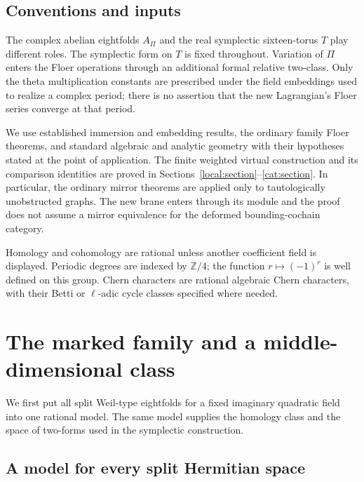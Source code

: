 \documentclass[11pt]{article}
\theoremstyle{definition}
\theoremstyle{remark}
\numberwithin{equation}{section}
\begin{document}
\subsection{Conventions and inputs}

The complex abelian eightfolds $A_\Pi$ and the real symplectic
sixteen-torus $T$ play different roles.  The symplectic form on $T$ is
fixed throughout.  Variation of $\Pi$ enters the Floer operations through
an additional formal relative two-class.  Only the theta multiplication
constants are prescribed under the field embeddings used to realize a
complex period; there is no assertion that the new Lagrangian's Floer
series converge at that period.

We use established immersion and embedding results, the ordinary
family Floer theorems, and standard algebraic and analytic geometry with
their hypotheses stated at the point of application.  The finite
weighted virtual construction and its comparison identities are proved
in Sections~\ref{local:section}--\ref{cat:section}.  In particular, the
ordinary mirror theorems are applied only to tautologically unobstructed
graphs.  The new brane enters through its module and the proof does not
assume a mirror equivalence for the deformed bounding-cochain category.

Homology and cohomology are rational unless another coefficient field is
displayed.  Periodic degrees are indexed by $\mathbb Z/4$; the function
$r\mapsto(-1)^r$ is well defined on this group.  Chern characters are
rational algebraic Chern characters, with their Betti or $\ell$-adic
cycle classes specified where needed.

\section{The marked family and a middle-dimensional class}
\label{hodge:section}

We first put all split Weil-type eightfolds for a fixed imaginary quadratic
field into one rational model.  The same model supplies the homology class
and the space of two-forms used in the symplectic construction.

\subsection{A model for every split Hermitian space}
\end{document}

